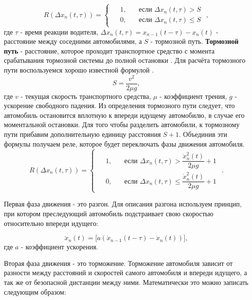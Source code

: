 \documentclass[12pt, a4paper]{extarticle}
\numberwithin{equation}{section}
\begin{document}
\begin{equation*}
R(\Delta x_{n}(t,\tau))=
\begin{cases}
\begin{split}
&1,\quad &\text{если }\Delta x_{n}(t,\tau) >S \\
&0,\quad &\text{если }\Delta x_{n}(t,\tau) \leq S
\end{split}
\end{cases},
\end{equation*}
где $\tau$ - время реакции водителя, $\Delta x_{n}(t,\tau)=x_{n-1}(t-\tau)-x_n(t)$ - расстояние между соседними автомобилями, а $S$ - тормозной путь. \textbf{Тормозной путь} - расстояние, которое проходит транспортное средство с момента срабатывания тормозной системы до полной остановки \cite{PDD}. Для расчёта тормозного пути воспользуемся хорошо известной формулой \cite{Physics}.
\begin{equation*} 
S=\dfrac{v^2}{2\mu g},
\end{equation*}
где $v$ - текущая скорость транспортного средства, $\mu$ - коэффициент трения, $g$ - ускорение свободного падения. Из определения тормозного пути следует, что автомобиль остановится вплотную к впереди идущему автомобилю, в случае его моментальной остановки. Для того чтобы разделить автомобили, к тормозному пути прибавим дополнительную единицу расстояния $S+1$. Объединив эти формулы получаем реле, которое будет переключать фазы движения автомобиля.
\begin{equation}\label{rele}
R(\Delta x_{n}(t,\tau))=
\begin{cases}
\begin{split}
&1,\quad &\text{если }\Delta x_{n}(t,\tau) > \dfrac{\dot{x}_n^2(t)}{2\mu g}+1 \\
&0,\quad &\text{если }\Delta x_{n}(t,\tau) \leq \dfrac{\dot{x}_n^2(t)}{2\mu g}+1
\end{split}
\end{cases}.
\end{equation}

Первая фаза движения - это разгон. Для описания разгона используем принцип, при котором преследующий автомобиль подстраивает свою скоростью относительно впереди идущего:

\begin{equation*}
\ddot{x}_n(t)= \bigg[ a(\dot{x}_{n-1}(t-\tau)-\dot{x}_n(t))\bigg],
\end{equation*}
где $a$ - коэффициент ускорения.

Вторая фаза движения - это торможение. Торможение автомобиля зависит от разности между расстояний и скоростей самого автомобиля и впереди идущего, а так же от безопасной дистанции между ними. Математически это можно записать следующим образом: 
\end{document}
